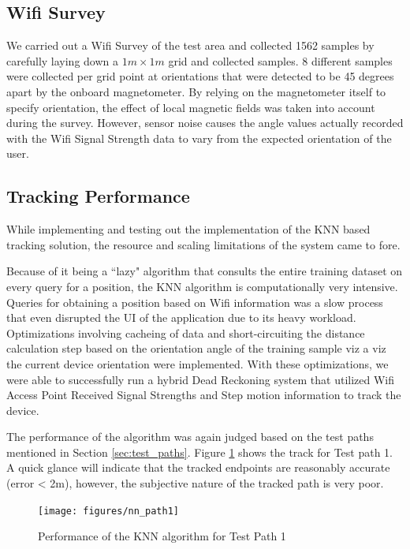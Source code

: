 \subsection{Wifi Survey}

We carried out a Wifi Survey of the test area and collected 1562 samples by 
carefully laying down a $1 m \times 1 m$ grid and collected samples. 8
different samples were collected per grid point at orientations that were
detected to be 45 degrees apart by the onboard magnetometer. By relying on
the magnetometer itself to specify orientation, the effect of local magnetic
fields was taken into account during the survey. However, sensor noise causes
the angle values actually recorded with the Wifi Signal Strength data to vary 
from the expected orientation of the user.

\subsection{Tracking Performance}

While implementing and testing out the implementation of the KNN based 
tracking solution, the resource and scaling limitations of the system 
came to fore. 

Because of it being a ``lazy" algorithm that consults the entire 
training dataset on every query for a position, the KNN algorithm
is computationally very intensive. Queries for obtaining a position based
on Wifi information was a slow process that even disrupted the UI of the 
application due to its heavy workload. Optimizations involving cacheing 
of data and short-circuiting the distance calculation step based on the 
orientation angle of the training sample viz a viz the current device 
orientation were implemented. With these optimizations, we were able 
to successfully run a hybrid Dead Reckoning system that utilized 
Wifi Access Point Received Signal Strengths and Step motion information
to track the device.

The performance of the algorithm was again judged based on the test paths 
mentioned in Section \ref{sec:test_paths}. Figure \ref{fig:nn_path1} shows
the track for Test path 1. A quick glance will indicate that the 
tracked endpoints are reasonably accurate (error < 2m), however, 
the subjective nature of the tracked path is very poor.

\begin{figure}
    \centering
    \texttt{[image: figures/nn\_path1]}
    \caption{Performance of the KNN algorithm for Test Path 1\label{fig:nn_path1}}
\end{figure}

